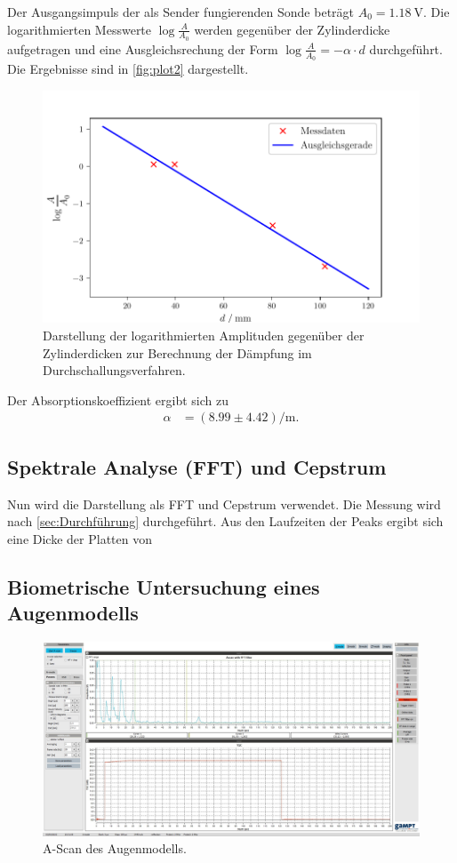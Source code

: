 Der Ausgangsimpuls der als Sender fungierenden Sonde beträgt $A_0= \qty{1.18}{\volt}$.
Die logarithmierten Messwerte $\log{\frac{A}{A_0}}$ werden gegenüber der Zylinderdicke aufgetragen und eine 
Ausgleichsrechung der Form $\log{\frac{A}{A_0}}= -\alpha \cdot d$ durchgeführt. Die Ergebnisse sind in \autoref{fig:plot2} dargestellt.
\begin{figure}[H]
  \centering
  \includegraphics{build/plot2.pdf}
  \caption {Darstellung der logarithmierten Amplituden gegenüber der Zylinderdicken zur Berechnung der Dämpfung im Durchschallungsverfahren.}
  \label{fig:plot2}
\end{figure}

Der Absorptionskoeffizient ergibt sich zu
\begin{align*}
  \alpha &=( 8.99\pm 4.42) \si{\per\meter}.
\end{align*}

\subsection{Spektrale Analyse (FFT) und Cepstrum}
\label{subsec:FFT}
Nun wird die Darstellung als FFT und Cepstrum verwendet. 
Die Messung wird nach \autoref{sec:Durchführung} durchgeführt.
Aus den Laufzeiten der Peaks ergibt sich eine Dicke der Platten von 


\subsection{Biometrische Untersuchung eines Augenmodells}
\label{subsec:Augew}

\begin{figure}[H]
  \centering
  \includegraphics{build/auge.jpg}
  \caption {A-Scan des Augenmodells.}
  \label{fig:auge}
\end{figure}


